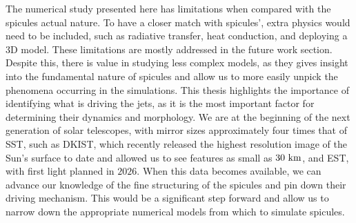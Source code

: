 %
The numerical study presented here has limitations when compared with the spicules actual nature. To have a closer match with spicules', extra physics would need to be included, such as radiative transfer, heat conduction, and deploying a 3D model. These limitations are mostly addressed in the future work section. Despite this, there is value in studying less complex models, as they gives insight into the fundamental nature of spicules and allow us to more easily unpick the phenomena occurring in the simulations. This thesis highlights the importance of identifying what is driving the jets, as it is the most important factor for determining their dynamics and morphology. We are at the beginning of the next generation of solar telescopes, with mirror sizes approximately four times that of SST, such as DKIST, which recently released the highest resolution image of the Sun's surface to date and allowed us to see features as small as $30~\rm{km}$, and EST, with first light planned in $2026$. When this data becomes available, we can advance our knowledge of the fine structuring of the spicules and pin down their driving mechanism. This would be a significant step forward and allow us to narrow down the appropriate numerical models from which to simulate spicules. 
